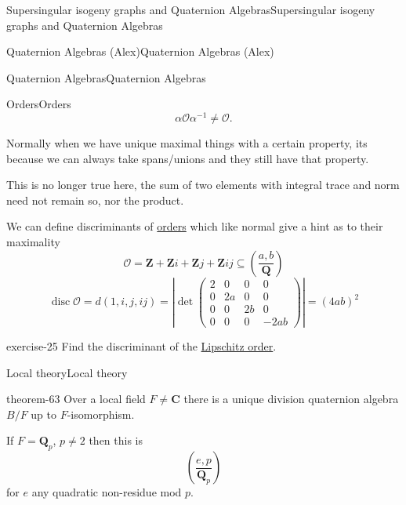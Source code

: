\documentclass[10pt,]{book}
\numberwithin{equation}{section}
\newcommand{\inv}{^{-1}}
\newcommand{\legendre}[2]{\left(\frac{#1}{#2}\right)}
\newcommand{\ZZ}{\mathbf{Z}}
\newcommand{\QQ}{\mathbf{Q}}
\newcommand{\CC}{\mathbf{C}}
\newcommand{\ints}{\mathcal{O}}
\DeclareMathOperator{\disc}{disc}
\newcommand{\amp}{&}
\begin{document}
\begin{chapterptx}{Supersingular isogeny graphs and Quaternion Algebras}{}{Supersingular isogeny graphs and Quaternion Algebras}{}{}
\begin{sectionptx}{Quaternion Algebras (Alex)}{}{Quaternion Algebras (Alex)}{}{}
\begin{subsectionptx}{Quaternion Algebras}{}{Quaternion Algebras}{}{}
\begin{subsubsectionptx}{Orders}{}{Orders}{}{}
\begin{equation*}
\alpha \ints \alpha\inv \ne \ints\text{.}
\end{equation*}
%
\par
\hypertarget{p-916}{}%
Normally when we have unique maximal things with a certain property, its because we can always take spans/unions and they still have that property.%
\par
\hypertarget{p-917}{}%
This is no longer true here, the sum of two elements with integral trace and norm need not remain so, nor the product.%
\par
\hypertarget{p-918}{}%
We can define discriminants of \hyperref[def-order-quaternion]{orders} which like normal give a hint as to their maximality%
\begin{equation*}
\ints = \ZZ + \ZZ i + \ZZ j + \ZZ ij \subseteq \legendre{a,b}{\QQ}
\end{equation*}
%
\begin{equation*}
\disc \ints  = d(1,i,j,ij) = \left| \det\begin{pmatrix} 2 \amp 0 \amp 0\amp 0 \\ 0 \amp 2a \amp 0 \amp 0 \\ 0 \amp 0 \amp 2b \amp 0 \\ 0 \amp 0 \amp 0 \amp -2ab\end{pmatrix}\right| = (4ab)^2
\end{equation*}
%
\begin{inlineexercise}{}{exercise-25}%
\hypertarget{p-919}{}%
Find the discriminant of the \hyperref[ex-lipshitz-order]{Lipschitz order}.%
\end{inlineexercise}
\end{subsubsectionptx}
%
%
\typeout{************************************************}
\typeout{************************************************}
%
\begin{subsubsectionptx}{Local theory}{}{Local theory}{}{}\label{subsubsection-2}
\begin{theorem}{}{}{theorem-63}%
\hypertarget{p-920}{}%
Over a local field \(F \ne \CC\) there is a unique division quaternion algebra \(B/F\) up to \(F\)-isomorphism.%
\par
\hypertarget{p-921}{}%
If \(F = \QQ_p\), \(p\ne 2\) then this is%
\begin{equation*}
\legendre{e,p}{\QQ_p}
\end{equation*}
for \(e\) any quadratic non-residue mod \(p\).%
\par
\hypertarget{p-922}{}%

\end{theorem}
\end{subsubsectionptx}
\end{subsectionptx}
\end{sectionptx}
\end{chapterptx}
\end{document}
